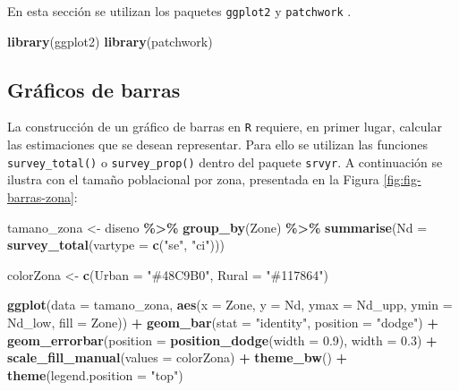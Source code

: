 \documentclass[
  spanish,
  12pt,
]{book}
\newenvironment{Shaded}{\begin{snugshade}}{\end{snugshade}}
\newcommand{\AttributeTok}[1]{\textcolor[rgb]{0.13,0.29,0.53}{#1}}
\newcommand{\FloatTok}[1]{\textcolor[rgb]{0.00,0.00,0.81}{#1}}
\newcommand{\FunctionTok}[1]{\textcolor[rgb]{0.13,0.29,0.53}{\textbf{#1}}}
\newcommand{\NormalTok}[1]{#1}
\newcommand{\OtherTok}[1]{\textcolor[rgb]{0.56,0.35,0.01}{#1}}
\newcommand{\SpecialCharTok}[1]{\textcolor[rgb]{0.81,0.36,0.00}{\textbf{#1}}}
\newcommand{\StringTok}[1]{\textcolor[rgb]{0.31,0.60,0.02}{#1}}
\begin{document}
En esta sección se utilizan los paquetes \texttt{ggplot2} \citep{Wickham2023} y \texttt{patchwork} \citep{patchwork}.

\begin{Shaded}
\begin{Highlighting}[]
\FunctionTok{library}\NormalTok{(ggplot2)}
\FunctionTok{library}\NormalTok{(patchwork)}
\end{Highlighting}
\end{Shaded}

\subsection{Gráficos de barras}\label{gruxe1ficos-de-barras}

La construcción de un gráfico de barras en \texttt{R} requiere, en primer lugar, calcular las estimaciones que se desean representar. Para ello se utilizan las funciones \texttt{survey\_total()} o \texttt{survey\_prop()} dentro del paquete \texttt{srvyr}. A continuación se ilustra con el tamaño poblacional por zona, presentada en la Figura \ref{fig:fig-barras-zona}:

\begin{Shaded}
\begin{Highlighting}[]
\NormalTok{tamano\_zona }\OtherTok{\textless{}{-}}\NormalTok{ diseno }\SpecialCharTok{\%\textgreater{}\%}
  \FunctionTok{group\_by}\NormalTok{(Zone) }\SpecialCharTok{\%\textgreater{}\%}
  \FunctionTok{summarise}\NormalTok{(}\AttributeTok{Nd =} \FunctionTok{survey\_total}\NormalTok{(}\AttributeTok{vartype =} \FunctionTok{c}\NormalTok{(}\StringTok{"se"}\NormalTok{, }\StringTok{"ci"}\NormalTok{)))}

\NormalTok{colorZona }\OtherTok{\textless{}{-}} \FunctionTok{c}\NormalTok{(}\AttributeTok{Urban =} \StringTok{"\#48C9B0"}\NormalTok{, }\AttributeTok{Rural =} \StringTok{"\#117864"}\NormalTok{)}

\FunctionTok{ggplot}\NormalTok{(}\AttributeTok{data =}\NormalTok{ tamano\_zona,}
  \FunctionTok{aes}\NormalTok{(}\AttributeTok{x =}\NormalTok{ Zone, }\AttributeTok{y =}\NormalTok{ Nd,}
      \AttributeTok{ymax =}\NormalTok{ Nd\_upp, }\AttributeTok{ymin =}\NormalTok{ Nd\_low,}
      \AttributeTok{fill =}\NormalTok{ Zone)) }\SpecialCharTok{+}
  \FunctionTok{geom\_bar}\NormalTok{(}\AttributeTok{stat =} \StringTok{"identity"}\NormalTok{, }\AttributeTok{position =} \StringTok{"dodge"}\NormalTok{) }\SpecialCharTok{+}
  \FunctionTok{geom\_errorbar}\NormalTok{(}\AttributeTok{position =} \FunctionTok{position\_dodge}\NormalTok{(}\AttributeTok{width =} \FloatTok{0.9}\NormalTok{), }\AttributeTok{width =} \FloatTok{0.3}\NormalTok{) }\SpecialCharTok{+}
  \FunctionTok{scale\_fill\_manual}\NormalTok{(}\AttributeTok{values =}\NormalTok{ colorZona) }\SpecialCharTok{+}
  \FunctionTok{theme\_bw}\NormalTok{() }\SpecialCharTok{+}
  \FunctionTok{theme}\NormalTok{(}\AttributeTok{legend.position =} \StringTok{"top"}\NormalTok{)}
\end{Highlighting}
\end{Shaded}
\end{document}
